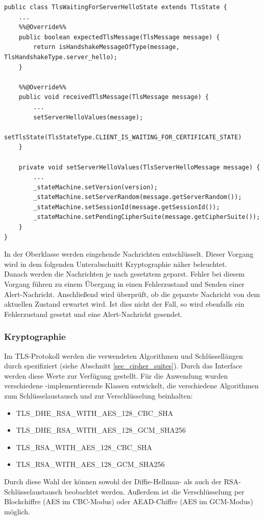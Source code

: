 \begin{lstlisting}
public class TlsWaitingForServerHelloState extends TlsState {
	...
	%%@Override%%
	public boolean expectedTlsMessage(TlsMessage message) {
		return isHandshakeMessageOfType(message, TlsHandshakeType.server_hello);
	}

	%%@Override%%
	public void receivedTlsMessage(TlsMessage message) {
		...
		setServerHelloValues(message);
		setTlsState(TlsStateType.CLIENT_IS_WAITING_FOR_CERTIFICATE_STATE)
	}

	private void setServerHelloValues(TlsServerHelloMessage message) {
		...
		_stateMachine.setVersion(version);
		_stateMachine.setServerRandom(message.getServerRandom());
		_stateMachine.setSessionId(message.getSessionId());
		_stateMachine.setPendingCipherSuite(message.getCipherSuite());
	}
}
\end{lstlisting}

In der Oberklasse  werden eingehende Nachrichten entschlüsselt. Dieser Vorgang wird in dem folgenden Unterabschnitt Kryptographie näher beleuchtet.\\
Danach werden die Nachrichten je nach gesetztem  geparst. Fehler bei diesem Vorgang führen zu einem Übergang in einen Fehlerzustand und Senden einer Alert-Nachricht. Anschließend wird überprüft, ob die geparste Nachricht von dem aktuellen Zustand erwartet wird. Ist dies nicht der Fall, so wird ebenfalls ein Fehlerzustand gesetzt und eine Alert-Nachricht gesendet.

\subsubsection{Kryptographie}
Im TLS-Protokoll werden die verwendeten Algorithmen und Schlüssellängen durch \ciphersuites{} spezifiziert (siehe Abschnitt \ref{sec_cipher_suites}). Durch das Interface  werden diese Werte zur Verfügung gestellt. Für die Anwendung wurden verschiedene -implementierende Klassen entwickelt, die verschiedene Algorithmen zum Schlüsselaustausch und zur Verschlüsselung beinhalten:
\begin{itemize}
\item TLS\_DHE\_RSA\_WITH\_AES\_128\_CBC\_SHA
\item TLS\_DHE\_RSA\_WITH\_AES\_128\_GCM\_SHA256
\item TLS\_RSA\_WITH\_AES\_128\_CBC\_SHA
\item TLS\_RSA\_WITH\_AES\_128\_GCM\_SHA256
\end{itemize}
Durch diese Wahl der \ciphersuites{} können sowohl der Diffie-Hellman- als auch der RSA-Schlüsselaustausch beobachtet werden. Außerdem ist die Verschlüsselung per Blockchiffre (AES im CBC-Modus) oder AEAD-Chiffre (AES im GCM-Modus) möglich.


